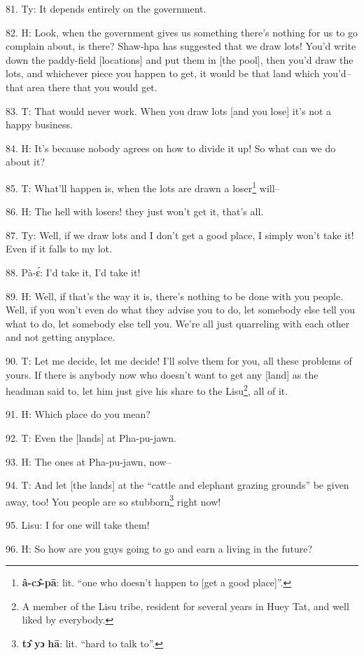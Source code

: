 81. Ty: It depends entirely on the government.

82. H: Look, when the government gives us something there's nothing for us to go
complain about, is there? Shaw-hpa has suggested that we draw lots! You'd write
down the paddy-field [locations] and put them in [the pool], then you'd draw the
lots, and whichever piece you happen to get, it would be that land which you'd--that
area there that you would get.

83. T: That would never work. When you draw lots [and you lose] it's not a
happy business.

84. H: It's because nobody agrees on how to divide it up! So what can we do about
it?

85. T: What'll happen is, when the lots are drawn a loser\footnote{\textbf{â-cɔ̂-pā}: lit. ``one who doesn't happen to [get a good place]''.} will--

86. H: The hell with losers! they just won't get it, that's all.

87. Ty: Well, if we draw lots and I don't get a good place, I simply won't
take it! Even if it falls to my lot.

88. Pà-ɛ́: I'd take it, I'd take it!

89. H: Well, if that's the way it is, there's nothing to be done with you people.
Well, if you won't even do what they advise you to do, let somebody else tell you
what to do, let somebody else tell you. We're all just quarreling with each other
and not getting anyplace.

90. T: Let me decide, let me decide! I'll solve them for you, all these problems
of yours. If there is anybody now who doesn't want to get any [land] as the headman
said to, let him just give his share to the Lisu\footnote{A member of the Lisu tribe, resident for several years in Huey Tat, and well liked by everybody.}, all of it.

91. H: Which place do you mean?

92. T: Even the [lands] at Pha-pu-jawn.

93. H: The ones at Pha-pu-jawn, now--

94. T: And let [the lands] at the ``cattle and elephant grazing grounds'' be
given away, too! You people are so stubborn\footnote{\textbf{tɔ̂} \textbf{yɔ} \textbf{hā}: lit. ``hard to talk to''.} right now!

95. Lisu: I for one will take them!

96. H: So how are you guys going to go and earn a living in the future?

